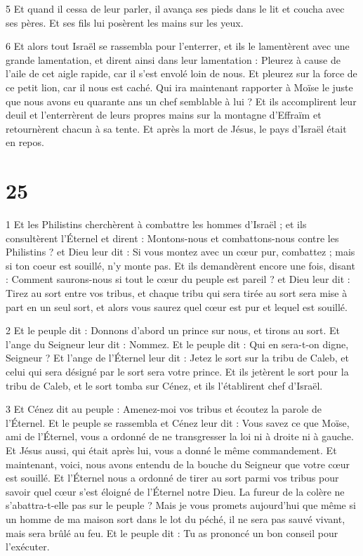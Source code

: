 \par 5 Et quand il cessa de leur parler, il avança ses pieds dans le lit et coucha avec ses pères. Et ses fils lui posèrent les mains sur les yeux.

\par 6 Et alors tout Israël se rassembla pour l'enterrer, et ils le lamentèrent avec une grande lamentation, et dirent ainsi dans leur lamentation : Pleurez à cause de l'aile de cet aigle rapide, car il s'est envolé loin de nous. Et pleurez sur la force de ce petit lion, car il nous est caché. Qui ira maintenant rapporter à Moïse le juste que nous avons eu quarante ans un chef semblable à lui ? Et ils accomplirent leur deuil et l'enterrèrent de leurs propres mains sur la montagne d'Effraïm et retournèrent chacun à sa tente. Et après la mort de Jésus, le pays d'Israël était en repos.

\chapter{25}

\par 1 Et les Philistins cherchèrent à combattre les hommes d'Israël ; et ils consultèrent l'Éternel et dirent : Montons-nous et combattons-nous contre les Philistins ? et Dieu leur dit : Si vous montez avec un cœur pur, combattez ; mais si ton coeur est souillé, n'y monte pas. Et ils demandèrent encore une fois, disant : Comment saurons-nous si tout le cœur du peuple est pareil ? et Dieu leur dit : Tirez au sort entre vos tribus, et chaque tribu qui sera tirée au sort sera mise à part en un seul sort, et alors vous saurez quel cœur est pur et lequel est souillé.

\par 2 Et le peuple dit : Donnons d'abord un prince sur nous, et tirons au sort. Et l'ange du Seigneur leur dit : Nommez. Et le peuple dit : Qui en sera-t-on digne, Seigneur ? Et l'ange de l'Éternel leur dit : Jetez le sort sur la tribu de Caleb, et celui qui sera désigné par le sort sera votre prince. Et ils jetèrent le sort pour la tribu de Caleb, et le sort tomba sur Cénez, et ils l'établirent chef d'Israël.

\par 3 Et Cénez dit au peuple : Amenez-moi vos tribus et écoutez la parole de l'Éternel. Et le peuple se rassembla et Cénez leur dit : Vous savez ce que Moïse, ami de l'Éternel, vous a ordonné de ne transgresser la loi ni à droite ni à gauche. Et Jésus aussi, qui était après lui, vous a donné le même commandement. Et maintenant, voici, nous avons entendu de la bouche du Seigneur que votre cœur est souillé. Et l'Éternel nous a ordonné de tirer au sort parmi vos tribus pour savoir quel cœur s'est éloigné de l'Éternel notre Dieu. La fureur de la colère ne s'abattra-t-elle pas sur le peuple ? Mais je vous promets aujourd'hui que même si un homme de ma maison sort dans le lot du péché, il ne sera pas sauvé vivant, mais sera brûlé au feu. Et le peuple dit : Tu as prononcé un bon conseil pour l'exécuter.

